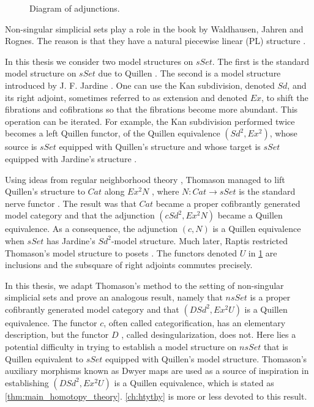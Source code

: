 \begin{figure}
\centering
{}
\caption{Diagram of adjunctions.}
\label{fig:Square_adjunctions}
\end{figure}

Non-singular simplicial sets play a role in the book \cite{WJR13} by Waldhausen, Jahren and Rognes. The reason is that they have a natural piecewise linear (PL) structure \cite[§3.4]{WJR13}.

In this thesis we consider two model structures on $sSet$. The first is the standard model structure on $sSet$ due to Quillen \cite{Qu67}. The second is a model structure introduced by J. F. Jardine \cite{Ja13}. One can use the Kan subdivision, denoted $Sd$, and its right adjoint, sometimes referred to as extension and denoted $Ex$, to shift the fibrations and cofibrations so that the fibrations become more abundant. This operation can be iterated. For example, the Kan subdivision performed twice becomes a left Quillen functor, of the Quillen equivalence $(Sd^2,Ex^2)$, whose source is $sSet$ equipped with Quillen's structure and whose target is $sSet$ equipped with Jardine's structure \cite[Thm.~1.1.,~p.~274]{Ja13}.

Using ideas from regular neighborhood theory \cite[§II]{Hu69}, Thomason managed to lift Quillen's structure to $Cat$ along $Ex^2N$ \cite{Th80}, where $N:Cat\to sSet$ is the standard nerve functor \cite[§2]{Se68}. The result was that $Cat$ became a proper cofibrantly generated model category and that the adjunction $(cSd^2,Ex^2N)$ became a Quillen equivalence. As a consequence, the adjunction $(c,N)$ is a Quillen equivalence when $sSet$ has Jardine's $Sd^2$-model structure. Much later, Raptis restricted Thomason's model structure to posets \cite{Ra10}. The functors denoted $U$ in \cref{fig:Square_adjunctions} are inclusions and the subsquare of right adjoints commutes precisely.

In this thesis, we adapt Thomason's method to the setting of non-singular simplicial sets and prove an analogous result, namely that $nsSet$ is a proper cofibrantly generated model category and that $(DSd^2,Ex^2U)$ is a Quillen equivalence. The functor $c$, often called categorification, has an elementary description, but the functor $D$ \cite[Rem.~2.2.12]{WJR13}, called desingularization, does not. Here lies a potential difficulty in trying to establish a model structure on $nsSet$ that is Quillen equivalent to $sSet$ equipped with Quillen's model structure. Thomason's auxiliary morphisms known as Dwyer maps are used as a source of inspiration in establishing $(DSd^2,Ex^2U)$ is a Quillen equivalence, which is stated as \cref{thm:main_homotopy_theory}. \cref{ch:htythy} is more or less devoted to this result.

